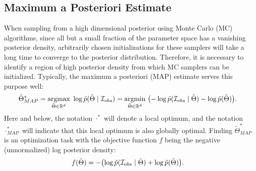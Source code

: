 

\subsection{Maximum a Posteriori Estimate}\label{sec:map}
When sampling from a high dimensional posterior using Monte Carlo (MC) algorithms, since all but a small fraction of the parameter space has a vanishing posterior density, arbitrarily chosen initializations for these samplers will take a long time to converge to the posterior distribution. 
Therefore, it is necessary to identify a region of high posterior density from which MC samplers can be initialized. Typically, the maximum a posteriori (MAP) estimate 
serves this purpose well:
\begin{equation}
    \tilde{\Theta}^*_{MAP} = \underset{\tilde{\Theta} \in \mathbb{R}^d}{\text{argmax}} \ \log \tilde{p}(\tilde{\Theta} \mid \mathcal{I}_{obs}) = \underset{\tilde{\Theta} \in \mathbb{R}^d}{\text{argmin}} \ \qty(-\log \tilde{p}(\mathcal{I}_{obs} \mid \tilde{\Theta}) - \log \tilde{p}(\tilde{\Theta})).
\end{equation}
Here and below, the notation $\cdot^*$ will denote a local optimum, 
and the notation $\cdot^*_{MAP}$ will indicate that this local optimum is also globally optimal. Finding $\tilde{\Theta}_{MAP}^*$ is an optimization task with the objective function $f$ being the negative (unnormalized) log posterior density:
\begin{equation}
f(\tilde{\Theta})= -\qty(\log \tilde{p}(\mathcal{I}_{obs} \mid \tilde{\Theta}) + \log \tilde{p}(\tilde{\Theta})). \label{eqn:obj-fun}
\end{equation}


